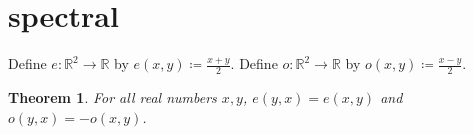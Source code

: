 \documentclass{article}
\newtheorem{theorem}{Theorem}
\begin{document}
\section{spectral}
Define $e:\mathbb{R}^2\to\mathbb{R}$ by $e(x,y)\coloneqq\frac{x+y}{2}$.
Define $o:\mathbb{R}^2\to\mathbb{R}$ by $o(x,y)\coloneqq\frac{x-y}{2}$.
\begin{theorem}\label{thm:RS03}
For all real numbers $x,y$, $e(y,x)=e(x,y)$ and $o(y,x)=-o(x,y)$.
\end{theorem}
\end{document}
